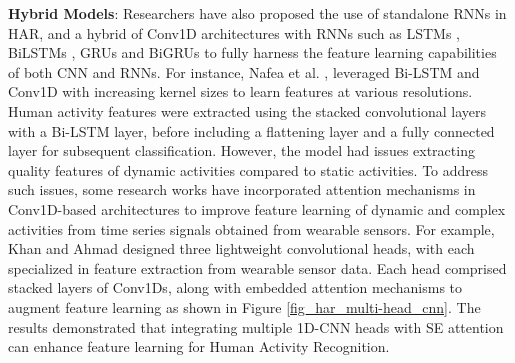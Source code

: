 \documentclass[preprint,12pt]{elsarticle}
\begin{document}
\textbf{Hybrid Models}: Researchers have also proposed the use of standalone RNNs in HAR, and a hybrid of Conv1D architectures with RNNs such as LSTMs \citep{deep_hybrid_2019}, BiLSTMs \citep{luwe_wearable_2022, shi_novel_2023}, GRUs \citep{dua_inception_2023} and BiGRUs \citep{imran_smart-wearable_2024} to fully harness the feature learning capabilities of both CNN and RNNs. For instance, Nafea et al. \citep{nafea_sensor-based_2021}, leveraged Bi-LSTM and Conv1D with increasing kernel sizes to learn features at various resolutions. Human activity features were extracted using the stacked convolutional layers with a Bi-LSTM layer, before including a flattening layer and a fully connected layer for subsequent classification. However, the model had issues extracting quality features of dynamic activities compared to static activities. To address such issues, some research works have incorporated attention mechanisms in Conv1D-based architectures to improve feature learning of dynamic and complex activities from time series signals obtained from wearable sensors. For example, Khan and Ahmad \citep{khan_attention_2021} designed three lightweight convolutional heads, with each specialized in feature extraction from wearable sensor data. Each head comprised stacked layers of Conv1Ds, along with embedded attention mechanisms to augment feature learning as shown in Figure \ref{fig_har_multi-head_cnn}. The results demonstrated that integrating multiple 1D-CNN heads with SE attention can enhance feature learning for Human Activity Recognition. 
\end{document}
